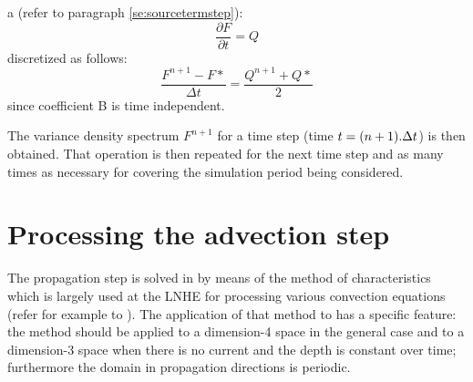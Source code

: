   a \textbf{} (refer to paragraph  \ref{se:sourcetermstep}):
\begin{equation} \label{GrindEQ__6_5_}
\frac{\partial F}{\partial t} =Q
\end{equation}
discretized as follows:
\begin{equation} \label{GrindEQ__6_6_}
\frac{F^{n+1} -F*}{\Delta t} =\frac{Q^{n+1} +Q*}{2}
\end{equation}
since coefficient B is time independent.

 The variance density spectrum $F^{n+1}$ for a time step (time $t=(n+1).\Delta t$) is then obtained. That operation is then repeated for the next time step and as many times as necessary for covering the simulation period being considered.


\section{ Processing the advection step}
\label{se:advectionstep}
 The propagation step is solved in \tomawac by means of the method of characteristics which is largely used at the LNHE for processing various convection equations (refer for example to \cite{Esposito1981}). The application of that method to \tomawac has a specific feature: the method should be applied to a dimension-4 space in the general case and to a dimension-3 space when there is no current and the depth is constant over time; furthermore the domain in propagation directions is periodic.

